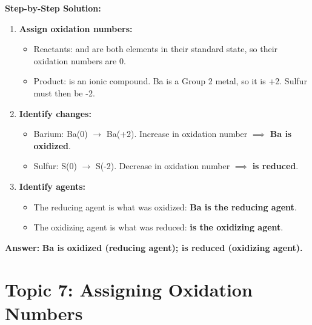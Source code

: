 \documentclass{article}
\begin{document}
\textbf{Step-by-Step Solution:}
\begin{enumerate}
    \item \textbf{Assign oxidation numbers:}
        \begin{itemize}
            \item Reactants:  and  are both elements in their standard state, so their oxidation numbers are 0.
            \item Product:  is an ionic compound. Ba is a Group 2 metal, so it is +2. Sulfur must then be -2.
        \end{itemize}
    \item \textbf{Identify changes:}
        \begin{itemize}
            \item Barium: Ba(0) $\rightarrow$ Ba(+2). Increase in oxidation number $\implies$ \textbf{Ba is oxidized}.
            \item Sulfur: S(0) $\rightarrow$ S(-2). Decrease in oxidation number $\implies$ \textbf{ is reduced}.
        \end{itemize}
    \item \textbf{Identify agents:}
        \begin{itemize}
            \item The reducing agent is what was oxidized: \textbf{Ba is the reducing agent}.
            \item The oxidizing agent is what was reduced: \textbf{ is the oxidizing agent}.
        \end{itemize}
\end{enumerate}

\textbf{Answer:} \textbf{Ba is oxidized (reducing agent);  is reduced (oxidizing agent).}

\section{Topic 7: Assigning Oxidation Numbers}
\end{document}
